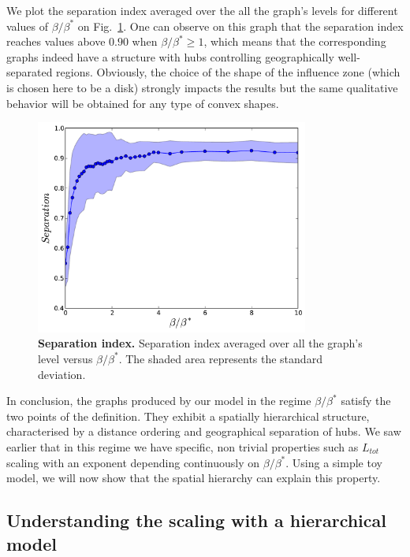 We plot the separation index averaged over the all the graph's levels for
different values of $\beta/\beta^*$ on Fig.~\ref{fig:separation}. One can
observe on this graph that the separation index reaches values above $0.90$ when
$\beta/\beta^* \geq 1$, which means that the corresponding graphs indeed have a
structure with hubs controlling geographically well-separated regions.
Obviously, the choice of the shape of the influence zone (which is chosen here
to be a disk) strongly impacts the results but the
same qualitative behavior will be obtained for any type of convex shapes.

\begin{figure}
    \centering
    \includegraphics[width=0.80\textwidth]{gfx/chapter-networks/figure6.pdf}
    \caption{{\bf Separation index.} Separation index averaged over all the graph's level versus
$\beta/\beta^*$. The shaded area represents the standard deviation.
\label{fig:separation}} 
\end{figure}

In conclusion, the graphs produced by our model in the regime $\beta / \beta^*$
satisfy the two points of the definition. They exhibit a spatially hierarchical
structure, characterised by a distance ordering and geographical separation of
hubs. We saw earlier that in this regime we have specific, non trivial
properties such as $L_{tot}$ scaling with an exponent depending continuously on
$\beta/\beta^*$. Using a simple toy model, we will now show that the spatial
hierarchy can explain this property.

\subsection{Understanding the scaling with a hierarchical model} 

